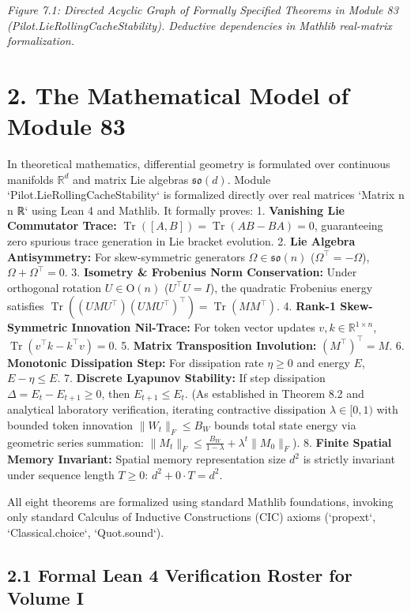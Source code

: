 \documentclass[11pt,twoside,openright]{amsbook}
\begin{document}
{{{{{{\textit{Figure 7.1: Directed Acyclic Graph of Formally Specified Theorems in Module 83 (Pilot.LieRollingCacheStability). Deductive dependencies in Mathlib real-matrix formalization.}

\section{2. The Mathematical Model of Module 83}

In theoretical mathematics, differential geometry is formulated over continuous manifolds $\mathbb{R}^d$ and matrix Lie algebras $\mathfrak{so}(d)$. Module `Pilot.LieRollingCacheStability` is formalized directly over real matrices `Matrix n n ℝ` using Lean 4 and Mathlib. It formally proves:
1. \textbf{Vanishing Lie Commutator Trace:} $\operatorname{Tr}([A, B]) = \operatorname{Tr}(AB - BA) = 0$, guaranteeing zero spurious trace generation in Lie bracket evolution.
2. \textbf{Lie Algebra Antisymmetry:} For skew-symmetric generators $\Omega \in \mathfrak{so}(n)$ ($\Omega^\top = -\Omega$), $\Omega + \Omega^\top = 0$.
3. \textbf{Isometry & Frobenius Norm Conservation:} Under orthogonal rotation $U \in \mathrm{O}(n)$ ($U^\top U = I$), the quadratic Frobenius energy satisfies $\operatorname{Tr}((U M U^\top)(U M U^\top)^\top) = \operatorname{Tr}(M M^\top)$.
4. \textbf{Rank-1 Skew-Symmetric Innovation Nil-Trace:} For token vector updates $v, k \in \mathbb{R}^{1 \times n}$, $\operatorname{Tr}(v^\top k - k^\top v) = 0$.
5. \textbf{Matrix Transposition Involution:} $(M^\top)^\top = M$.
6. \textbf{Monotonic Dissipation Step:} For dissipation rate $\eta \ge 0$ and energy $E$, $E - \eta \le E$.
7. \textbf{Discrete Lyapunov Stability:} If step dissipation $\Delta = E_t - E_{t+1} \ge 0$, then $E_{t+1} \le E_t$. (As established in Theorem 8.2 and analytical laboratory verification, iterating contractive dissipation $\lambda \in [0, 1)$ with bounded token innovation $\|W_t\|_F \le B_W$ bounds total state energy via geometric series summation: $\|M_t\|_F \le \frac{B_W}{1 - \lambda} + \lambda^t \|M_0\|_F$).
8. \textbf{Finite Spatial Memory Invariant:} Spatial memory representation size $d^2$ is strictly invariant under sequence length $T \ge 0$: $d^2 + 0 \cdot T = d^2$.

All eight theorems are formalized using standard Mathlib foundations, invoking only standard Calculus of Inductive Constructions (CIC) axioms (`propext`, `Classical.choice`, `Quot.sound`).

\subsection{2.1 Formal Lean 4 Verification Roster for Volume I}

}}}}}}
\end{document}
